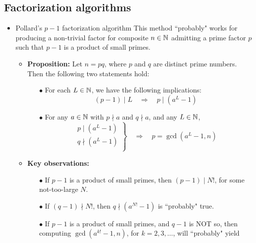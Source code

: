 \subsection{Factorization algorithms}

\begin{itemize}
\item	Pollard's $p-1$ factorization algorithm
		\vskip 0.1cm
		This method {\color{red}``probably"} works for producing a non-trivial factor for composite $n \in \mathbb{N}$
		admitting a prime factor $p$ such that {\color{red}$p-1$ is a product of small primes.}
		\begin{itemize}
		\item	\textbf{Proposition:}\quad
				Let $n = pq$, where $p$ and $q$ are distinct prime numbers.
				Then the following two statements hold:
				\begin{itemize}
				\item[$\bullet$]	For each $L \in \mathbb{N}$, we have the following implications:
								\begin{equation*}
								(p-1) \mid L \quad \Longrightarrow \quad p \mid (a^{L} - 1)
								\end{equation*}				
				\item[$\bullet$]	For any $a \in \mathbb{N}$ with $p \nmid a$ and $q \nmid a$, and any $L \in \mathbb{N}$, 
								\begin{equation*}
								\left.\begin{array}{l}
								p \mid (a^{L} - 1) \\
								q \nmid (a^{L} -1) \\
								\end{array}\right\}
								\quad\Longrightarrow\quad
								p = \gcd(a^{L}-1,n)
								\end{equation*}
				\end{itemize}
		\item	\textbf{Key observations:}
				\begin{itemize}
				\item[$\bullet$]	If $p-1$ is a product of small primes, then $(p-1) \mid N!$, for some not-too-large $N$.  
				\item[$\bullet$]	If $(q-1) \nmid N!$, then $q \nmid (a^{N!}-1)$ is ``probably" true.
				\item[$\bullet$]	If $p-1$ is a product of small primes, and $q-1$ is NOT so, then
								computing $\gcd(a^{k!}-1,n)$, for $k = 2,3,\ldots$, will ``probably" yield

\end{itemize}
\end{itemize}
\end{itemize}
